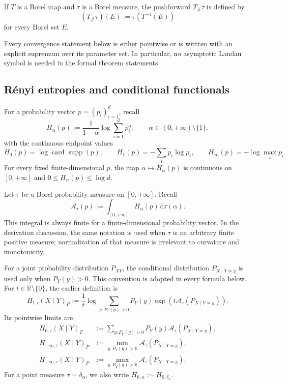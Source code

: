 \documentclass[9pt]{extarticle}
\theoremstyle{definition}
\theoremstyle{remark}
\newcommand{\R}{\mathbb R}
\newcommand{\supp}{\operatorname{supp}}
\newcommand{\dd}{\,\mathrm d}
\newcommand{\A}{\mathcal A}
\newcommand{\card}{\operatorname{card}}
\begin{document}
If $T$ is a Borel map and $\tau$ is a Borel measure, the pushforward
$T_\#\tau$ is defined by
\[
 (T_\#\tau)(E):=\tau(T^{-1}(E))
\]
for every Borel set $E$.

Every convergence statement below is either pointwise or is written with an
explicit supremum over its parameter set.  In particular, no asymptotic
Landau symbol is needed in the formal theorem statements.

\subsection{R\'enyi entropies and conditional functionals}

For a probability vector $p=(p_i)_{i=1}^d$, recall
\begin{equation}
 H_\alpha(p)
 :=\frac{1}{1-\alpha}\log\sum_{i=1}^d p_i^\alpha,
 \qquad \alpha\in(0,+\infty)\setminus\{1\},
 \label{eq:renyi-definition}
\end{equation}
with the continuous endpoint values
\begin{equation}
 H_0(p)=\log\card\supp(p),\qquad
 H_1(p)=-\sum_i p_i\log p_i,\qquad
 H_\infty(p)=-\log\max_i p_i.
 \label{eq:renyi-endpoints}
\end{equation}
For every fixed finite-dimensional $p$, the map
$\alpha\mapsto H_\alpha(p)$ is continuous on $[0,+\infty]$ and
$0\leq H_\alpha(p)\leq\log d$.

Let $\tau$ be a Borel probability measure on $[0,+\infty]$. Recall
\begin{equation}
 \A_\tau(p):=\int_{[0,+\infty]}H_\alpha(p)\dd\tau(\alpha).
 \label{eq:A-tau}
\end{equation}
This integral is always finite for a finite-dimensional probability vector.
In the derivation discussion, the same notation is used when $\tau$ is an
arbitrary finite positive measure; normalization of that measure is irrelevant
to curvature and monotonicity.

For a joint probability distribution $P_{XY}$, the conditional distribution
$P_{X\mid Y=y}$ is used only when $P_Y(y)>0$. This convention is adopted in
every formula below. For $t\in\R\setminus\{0\}$, the earlier definition is
\begin{equation}
 H_{t,\tau}(X\mid Y)_P
 :=\frac1t\log\sum_{y:P_Y(y)>0}P_Y(y)
       \exp\!\left(t\A_\tau(P_{X\mid Y=y})\right).
 \label{eq:H-temperate}
\end{equation}
Its pointwise limits are
\begin{align}
 H_{0,\tau}(X\mid Y)_P
 &:=\sum_{y:P_Y(y)>0}P_Y(y)\A_\tau(P_{X\mid Y=y}),
 \label{eq:H-zero}\\
 H_{-\infty,\tau}(X\mid Y)_P
 &:=\min_{y:P_Y(y)>0}\A_\tau(P_{X\mid Y=y}),
 \label{eq:H-minus-infty}\\
 H_{+\infty,\tau}(X\mid Y)_P
 &:=\max_{y:P_Y(y)>0}\A_\tau(P_{X\mid Y=y}).
 \label{eq:H-plus-infty}
\end{align}
For a point measure $\tau=\delta_\alpha$, we also write
$H_{0,\alpha}:=H_{0,\delta_\alpha}$.
\end{document}
